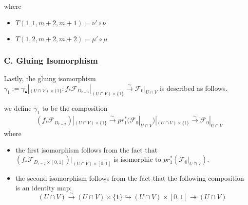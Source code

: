 where 
\begin{itemize}
\item $T(1,1,m+2,m+1) = \nu' \circ \nu$
\item $T(1,2,m+2,m+2) = \mu' \circ \mu$
\end{itemize}

\subsubsection{C. Gluing Isomorphism}
Lastly, the gluing isomorphism $\gamma_1 := \gamma_\bullet|_{(U\cap V)\times \{1\}}:  f_*\mathscr{F}_{D_{r=2}}|_{(U\cap V)\times \{1\}}\xrightarrow{\sim} \mathscr{F}_0|_{U\cap V}$ is described as follows.

\begin{definition}
we define $\gamma_1$ to be the composition
\begin{align*}
&(f_*\mathscr{F}_{D_{r=2}})|_{(U\cap V)\times \{1\}}\xrightarrow{\sim}pr_1^*(\mathscr{F}_0|_{U\cap V})|_{(U\cap V)\times \{1\}}\xrightarrow{\sim}\mathscr{F}_0|_{U\cap V}
\end{align*}
where
\begin{itemize}
\item the first isomorphism follows from the fact that $(f_*\mathscr{F}_{D_{r=2}\times [0,1]})|_{(U\cap V)\times[0,1]}$ is isomorphic to $pr_1^*(\mathscr{F}_0|_{U\cap V})$.

\item the second isomorphism follows from the fact that the following composition is an identity map:
\[
(U\cap V)\xrightarrow{\sim} (U\cap V)\times \{1\} \hookrightarrow (U\cap V)\times [0,1] \twoheadrightarrow (U\cap V)
\]
\end{itemize}
\end{definition}
\pagebreak